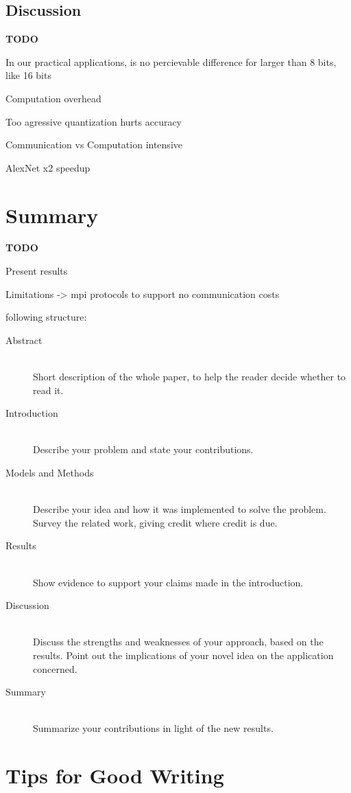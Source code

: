 \documentclass[10pt,conference,compsocconf]{IEEEtran}
\begin{document}
\subsection{Discussion}

\textbf{TODO}

In our practical applications, is no percievable difference for larger than 8 bits, like 16 bits

Computation overhead

Too agressive quantization hurts accuracy

Communication vs Computation intensive

AlexNet x2 speedup

\section{Summary}

\textbf{TODO}

Present results

Limitations -> mpi protocols to support
no communication costs

following structure:
\begin{description}
\item[Abstract] \ \\
  Short description of the whole paper, to help the
  reader decide whether to read it.
\item[Introduction] \ \\
  Describe your problem and state your
  contributions.
\item[Models and Methods] \ \\
  Describe your idea and how it was implemented to solve
  the problem. Survey the related work, giving credit where credit is
  due.
\item[Results] \ \\
  Show evidence to support your claims made in the
  introduction.
\item[Discussion] \ \\
  Discuss the strengths and weaknesses of your
  approach, based on the results. Point out the implications of your
  novel idea on the application concerned.
\item[Summary] \ \\
  Summarize your contributions in light of the new
  results.
\end{description}


\section{Tips for Good Writing}
\label{sec:tips-writing}
\end{document}
